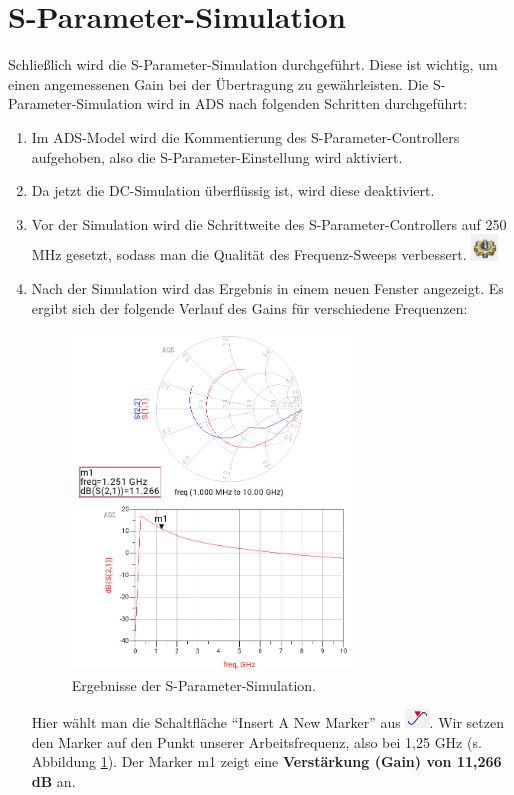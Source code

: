 \section{S-Parameter-Simulation}
Schließlich wird die S-Parameter-Simulation durchgeführt. Diese ist wichtig, um einen angemessenen Gain bei der Übertragung zu gewährleisten.
Die S-Parameter-Simulation wird in \ac{ADS} nach folgenden Schritten durchgeführt:
\begin{enumerate}
    \item Im ADS-Model wird die Kommentierung des S-Parameter-Controllers aufgehoben, also die S-Parameter-Einstellung wird aktiviert.
    \item Da jetzt die DC-Simulation überflüssig ist, wird diese deaktiviert.
    \item Vor der Simulation wird die Schrittweite des S-Parameter-Controllers auf 250 MHz gesetzt, sodass man die Qualität des Frequenz-Sweeps verbessert.
    \includegraphics[height=0.7cm]{Pictures/simulate.png}
    \item Nach der Simulation wird das Ergebnis in einem neuen Fenster angezeigt. Es ergibt sich der folgende Verlauf des Gains für verschiedene Frequenzen:
    
    \begin{figure}[h]
            \centering
            \includegraphics[width=0.7\textwidth]{Pictures/SParameter.png}
            \caption{Ergebnisse der S-Parameter-Simulation.}
            \label{fig:SParameter}
        \end{figure}
    
    Hier wählt man die Schaltfläche \enquote{Insert A New Marker} aus \includegraphics[height=0.5cm]{Pictures/marker.png}.
    Wir setzen den Marker auf den Punkt unserer Arbeitsfrequenz, also bei 1{,}25 GHz (s. Abbildung \ref{fig:SParameter}). Der Marker m1 zeigt eine \textbf{Verstärkung (Gain) von 11,266 dB} an.
\end{enumerate}



